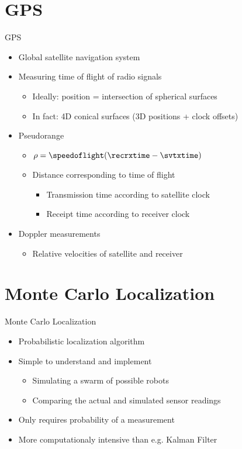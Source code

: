 \documentclass[utf8]{beamer}
\begin{document}
\section{GPS}
\begin{frame}{GPS}
    \begin{itemize}
        \item Global satellite navigation system
        \item Measuring time of flight of radio signals
        \begin{itemize}
            \item Ideally: position = intersection of spherical surfaces
            \item In fact: 4D conical surfaces (3D positions + clock offsets)
        \end{itemize}
        \item Pseudorange
        \begin{itemize}
            \item \(\rho = \speedoflight (\recrxtime - \svtxtime)\)
            \item Distance corresponding to time of flight
            \begin{itemize}
                \item Transmission time according to satellite clock
                \item Receipt time according to receiver clock
            \end{itemize}
        \end{itemize}
        \item Doppler measurements
        \begin{itemize}
            \item Relative velocities of satellite and receiver
        \end{itemize}
    \end{itemize}
\end{frame}

\section{Monte Carlo Localization}
\begin{frame}{Monte Carlo Localization}
    \begin{itemize}
        \item Probabilistic localization algorithm
        \item Simple to understand and implement
        \begin{itemize}
            \item Simulating a swarm of possible robots
            \item Comparing the actual and simulated sensor readings
        \end{itemize}
        \item Only requires probability of a measurement
        \item More computationaly intensive than e.g. Kalman Filter
    \end{itemize}
\end{frame}
\end{document}

